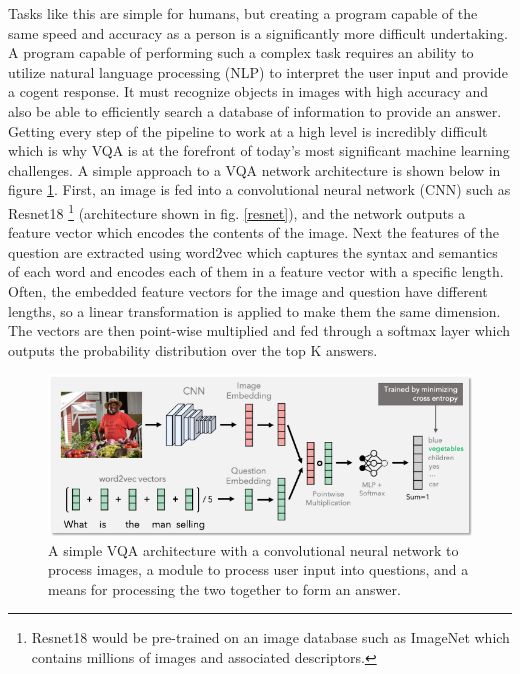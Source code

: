 \documentclass[manuscript,11pt]{article}
\begin{document}
Tasks like this are simple for humans, but creating a program capable of the same speed and accuracy as a person is a significantly more difficult undertaking. A program capable of performing such a complex task requires an ability to utilize natural language processing (NLP) to interpret the user input and provide a cogent response. It must recognize objects in images with high accuracy and also be able to efficiently search a database of information to provide an answer. Getting every step of the pipeline to work at a high level is incredibly difficult which is why VQA is at the forefront of today's most significant machine learning challenges. 
A simple approach to a VQA network architecture is shown below in figure \ref{vqaarchitecture}. First, an image is fed into a convolutional neural network (CNN) such as Resnet18 \footnote{Resnet18 would be pre-trained on an image database such as ImageNet which contains millions of images and associated descriptors.} (architecture shown in fig. \ref{resnet}), and the network outputs a feature vector which encodes the contents of the image. Next the features of the question are extracted using word2vec which captures the syntax and semantics of each word and encodes each of them in a feature vector with a specific length. Often, the embedded feature vectors for the image and question have different lengths, so a linear transformation is applied to make them the same dimension. The vectors are then point-wise multiplied and fed through a softmax layer which outputs the probability distribution over the top K answers. \\

\begin{figure}[h]
\centering
\includegraphics[scale=.5]{vqaarchitecture}
\caption{A simple VQA architecture with a convolutional neural network to process images, a module to process user input into questions, and a means for processing the two together to form an answer.}
\label{vqaarchitecture}
\end{figure} 
\end{document}
